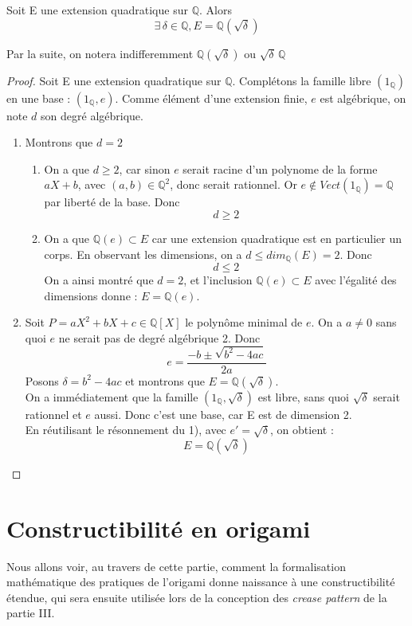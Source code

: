 \documentclass[a4paper,12pt,french]{report}
\begin{document}
		\begin{proposition}
			Soit E une extension quadratique sur $\mathbb{Q}$. Alors
			\[{}
				\exists\, \delta \in \mathbb{Q}, E = \mathbb{Q}(\sqrt{\delta})
			\]
		\end{proposition}
		 Par la suite, on notera indifferemment $\mathbb{Q}(\sqrt{\delta})$ ou $\sqrt{\delta}\,\mathbb{Q}$
		\begin{proof}
			Soit E une extension quadratique sur $\mathbb{Q}$. Complétons la famille libre $(1_{\mathbb{Q}})$ en une base : $(1_{\mathbb{Q}},e)$. Comme élément d'une extension finie, $e$ est algébrique, on note $d$ son degré algébrique.
			\begin{enumerate}
				\item  Montrons que $d = 2$
				\begin{enumerate}
				    \item On a que $d\geq2$, car sinon $e$ serait racine d'un polynome de la forme $aX +b$, avec $(a,b) \in \mathbb{Q}^{2}$, donc serait rationnel. Or  $e \notin Vect(1_{\mathbb{Q}}) = \mathbb{Q}$ par liberté de la base. Donc \[d\geq 2\]
				    \item On a que $\mathbb{Q}(e) \subset E $ car une extension quadratique est en particulier un corps. En observant les dimensions, on a $d \leq dim_{\mathbb{Q}}(E) = 2$. Donc 
				    \[d \leq 2\] On a ainsi montré que $d=2$, et l'inclusion $\mathbb{Q}(e) \subset E $ avec l'égalité des dimensions donne : $E = \mathbb{Q}(e)$.
				\end{enumerate}
				
				\item  Soit $P = aX^{2} + bX +c \in \mathbb{Q}[X]$ le polynôme minimal de $e$. On a $a\neq 0$ sans quoi $e$ ne serait pas de degré algébrique 2. Donc \[e = \frac{-b \pm \sqrt{b^{2} - 4ac}}{2a}\]
				Posons $\delta = b^{2} - 4ac$ et montrons que $E = \mathbb{Q}(\sqrt{\delta})$.\\
				On a immédiatement que la famille \((1_{\mathbb{Q}},\sqrt{\delta})\) est libre, sans quoi $\sqrt{\delta}$ serait rationnel et $e$ aussi. Donc c'est une base, car E est de dimension 2.\\
				En réutilisant le résonnement du 1), avec $e' = \sqrt{\delta}$, on obtient : \[E = \mathbb{Q}(\sqrt{\delta})\]
				    
				    
			\end{enumerate}
		\end{proof}

\chapter{Constructibilité en origami}
	Nous allons voir, au travers de cette partie, comment la formalisation mathématique des pratiques de l'origami donne naissance à une constructibilité étendue, qui sera ensuite utilisée lors de la conception des \emph{crease pattern} de la partie III.
	
\end{document}
